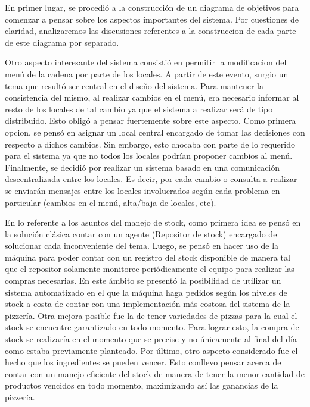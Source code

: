 \documentclass[a4paper,11pt] {article}
\begin{document}
En primer lugar, se procedi\'o a la construcci\'on de un diagrama de objetivos para comenzar a pensar sobre los aspectos importantes del sistema. Por cuestiones de claridad, analizaremos las discusiones referentes a la construccion de cada parte de este diagrama por separado.

Otro aspecto interesante del sistema consisti\'o en permitir la modificacion del men\'u de la cadena por parte de los locales. A partir de este evento, surgio un tema que result\'o ser central en el dise\~no del sistema. Para mantener la consistencia del mismo, al realizar cambios en el men\'u, era necesario informar al resto de los locales de tal cambio ya que el sistema a realizar ser\'a de tipo distribuido. Esto oblig\'o a pensar fuertemente sobre este aspecto. Como primera opcion, se pens\'o en asignar un local central encargado de tomar las decisiones con respecto a dichos cambios. Sin embargo, esto chocaba con parte de lo requerido para el sistema ya que no todos los locales podr\'ian proponer cambios al men\'u. Finalmente, se decidi\'o por realizar un sistema basado en una comunicaci\'on descentralizada entre los locales. Es decir, por cada cambio o consulta a realizar se enviar\'an mensajes entre los locales involucrados seg\'un cada problema en particular (cambios en el men\'u, alta/baja de locales, etc).

En lo referente a los asuntos del manejo de stock, como primera idea se pens\'o en la soluci\'on cl\'asica contar con un agente (Repositor de stock) encargado de solucionar cada inconveniente del tema. Luego, se pensó en hacer uso de la máquina para poder contar con un registro del stock disponible de manera tal que el repositor solamente monitoree peri\'odicamente el equipo para realizar las compras necesarias. En este \'ambito se present\'o la posibilidad de utilizar un sistema  automatizado en el que la m\'aquina haga pedidos seg\'un los niveles de stock a costa de contar con una implementaci\'on m\'as costosa del sistema de la pizzer\'ia. Otra mejora posible fue la de tener variedades de pizzas para la cual el stock se encuentre garantizado en todo momento. Para lograr esto, la compra de stock se realizaría en el momento que se precise y no \'unicamente al final del día como estaba previamente planteado. Por \'ultimo, otro aspecto considerado fue el hecho que los ingredientes se pueden vencer. Esto conllevo pensar acerca de contar con un manejo eficiente del stock de manera de tener la menor cantidad de productos vencidos en todo momento, maximizando as\'i las ganancias de la pizzer\'ia.
 
\end{document}
